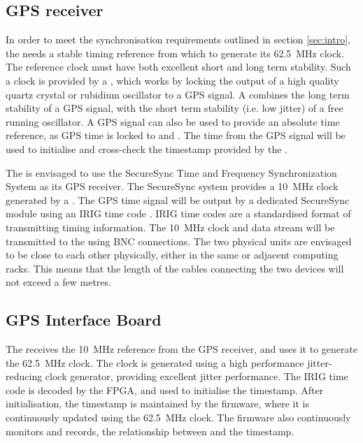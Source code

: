 \documentclass{dune}
\begin{document}
\subsection{GPS receiver}
In order to meet the synchronisation requirements outlined in section \ref{sec:intro}, the  needs a stable timing reference from which to generate its \SI{62.5}{\MHz} clock. The reference clock must have both excellent short and long term stability. Such a clock is provided by a , which works by locking the output of a high quality quartz crystal or rubidium oscillator to a GPS signal. A  combines the long term stability of a GPS signal, with the short term stability (i.e. low jitter) of a free running oscillator. A GPS signal can also be used to provide an absolute time reference, as GPS time is locked to  and . The time from the GPS signal will be used to initialise and cross-check the timestamp provided by the .

The  is envisaged to use the SecureSync Time and Frequency Synchronization System \cite{secure_sync_datasheet} as its GPS receiver. The SecureSync system provides a \SI{10}{\MHz} clock generated by a . The GPS time signal will be output by a dedicated SecureSync module \cite{secure_sync_modules} using an IRIG time code \cite{irig}. IRIG time codes are a standardised format of transmitting timing information. The \SI{10}{\MHz} clock and  data stream will be transmitted to the  using BNC connections. The two physical units are envisaged to be close to each other physically, either in the same or adjacent computing racks. This means that the length of the cables connecting the two devices will not exceed a few metres.

\subsection{GPS Interface Board}
The  receives the \SI{10}{\MHz} reference from the GPS receiver, and uses it to generate the \SI{62.5}{\MHz}  clock. The clock is generated using a high performance jitter-reducing clock generator, providing excellent jitter performance. The IRIG time code is decoded by the  FPGA, and used to initialise the  timestamp. After initialisation, the  timestamp is maintained by the  firmware, where it is continuously updated using the \SI{62.5}{\MHz} clock. The firmware also continuously monitors and records, the relationship between  and the  timestamp.
\end{document}
